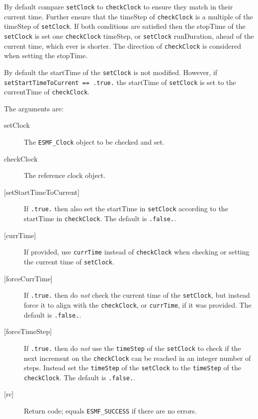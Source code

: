      By default compare {\tt setClock} to {\tt checkClock} to ensure they match
     in their current time. Further ensure that the timeStep of {\tt checkClock}
     is a multiple of the timeStep of {\tt setClock}. If both conditions are 
     satisfied then the stopTime of the {\tt setClock} is set one 
     {\tt checkClock} timeStep, or {\tt setClock} runDuration, ahead of the
     current time, which ever is shorter. The direction of {\tt checkClock}
     is considered when setting the stopTime.
  
     By default the startTime of the {\tt setClock} is not modified. However, if
     {\tt setStartTimeToCurrent == .true.} the startTime of {\tt setClock} is set
     to the currentTime of {\tt checkClock}.
  
     The arguments are:
     \begin{description}
     \item[setClock]
       The {\tt ESMF\_Clock} object to be checked and set.
     \item[checkClock]
       The reference clock object.
     \item[{[setStartTimeToCurrent]}]
       If {\tt .true.} then also set the startTime in {\tt setClock} according to
       the startTime in {\tt checkClock}. The default is {\tt .false.}.
     \item[{[currTime]}]
       If provided, use {\tt currTime} instead of {\tt checkClock} when checking
       or setting the current time of {\tt setClock}.
     \item[{[forceCurrTime]}]
       If {\tt .true.} then do {\em not} check the current time of the
       {\tt setClock}, but instead force it to align with the {\tt checkClock},
       or {\tt currTime}, if it was provided. The default is {\tt .false.}.
     \item[{[forceTimeStep]}]
       If {\tt .true.} then do {\em not} use the {\tt timeStep} of the 
       {\tt setClock} to check if the next increment on the {\tt checkClock}
       can be reached in an integer number of steps. Instead set the
       {\tt timeStep} of the {\tt setClock} to the {\tt timeStep} of the
       {\tt checkClock}. The default is {\tt .false.}.
     \item[{[rc]}]
       Return code; equals {\tt ESMF\_SUCCESS} if there are no errors.
     \end{description}
   
 
\mbox{}\hrulefill\ 
 
